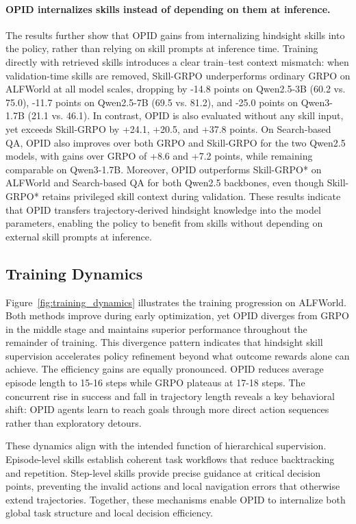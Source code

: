 \paragraph{OPID internalizes skills instead of depending on them at inference.}
The results further show that OPID gains from internalizing hindsight skills into the policy, rather than relying on skill prompts at inference time. Training directly with retrieved skills introduces a clear train--test context mismatch: when validation-time skills are removed, Skill-GRPO underperforms ordinary GRPO on ALFWorld at all model scales, dropping by -14.8 points on Qwen2.5-3B (60.2 vs. 75.0), -11.7 points on Qwen2.5-7B (69.5 vs. 81.2), and -25.0 points on Qwen3-1.7B (21.1 vs. 46.1). In contrast, OPID is also evaluated without any skill input, yet exceeds Skill-GRPO by +24.1, +20.5, and +37.8 points. On Search-based QA, OPID also improves over both GRPO and Skill-GRPO for the two Qwen2.5 models, with gains over GRPO of +8.6 and +7.2 points, while remaining comparable on Qwen3-1.7B. Moreover, OPID outperforms Skill-GRPO* on ALFWorld and Search-based QA for both Qwen2.5 backbones, even though Skill-GRPO* retains privileged skill context during validation. These results indicate that OPID transfers trajectory-derived hindsight knowledge into the model parameters, enabling the policy to benefit from skills without depending on external skill prompts at inference.

\subsection{Training Dynamics}
Figure~\ref{fig:training_dynamics} illustrates the training progression on ALFWorld. Both methods improve during early optimization, yet OPID diverges from GRPO in the middle stage and maintains superior performance throughout the remainder of training. This divergence pattern indicates that hindsight skill supervision accelerates policy refinement beyond what outcome rewards alone can achieve. The efficiency gains are equally pronounced. OPID reduces average episode length to 15-16 steps while GRPO plateaus at 17-18 steps. The concurrent rise in success and fall in trajectory length reveals a key behavioral shift: OPID agents learn to reach goals through more direct action sequences rather than exploratory detours.

These dynamics align with the intended function of hierarchical supervision. Episode-level skills establish coherent task workflows that reduce backtracking and repetition. Step-level skills provide precise guidance at critical decision points, preventing the invalid actions and local navigation errors that otherwise extend trajectories. Together, these mechanisms enable OPID to internalize both global task structure and local decision efficiency.

